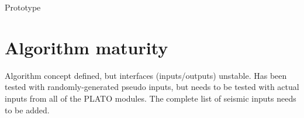 \documentclass[a4paper, oneside, 11pt, article, english]{memoir}
\begin{document}
Prototype

\iffalse
{
  \itshape

  The algorithms which are specified for the pipeline can come in different
  shapes and forms. We expect that the specifications will be delivered to the
  PDC under different forms, accordingly. Please indicate which one applies to
  the specified algorithm:

  \begin{itemize}
    \firmlist
  \item a legacy code. In that case, please contact WP12 office because some
    quality requirements are needed.
  \item a prototype. In that case, and in the first version of this document, no
    pseudo-code is to be provided.
  \item a pseudo-code. If no prototype exists, a workflow describing the
    algorithm main steps and a detailed pseudo-code is needed for
    implementation.
  \end{itemize}
}
\fi


\section{Algorithm maturity}
\label{sec:mature}

Algorithm concept defined, but interfaces (inputs/outputs) unstable. 
Has been tested with randomly-generated pseudo inputs, but needs to be tested with actual inputs from all of the PLATO modules. The complete list of seismic inputs needs to be added. 

\iffalse
{
  \itshape

  Please specify the maturity level of the algorithm and do not hesitate to
  provide any further information on the current status of the algorithm. The
  convention for algorithm maturity is defined as:

  \begin{itemize}
    \firmlist
  \item algorithm not defined
  \item algorithm concept defined, but interfaces (inputs/outputs) unstable
  \item algorithm concept defined and interfaces (inputs/outputs) stable, but
    not all processing steps stable
  \item no change or only minor changes expected
  \end{itemize}

}
\fi
\end{document}
